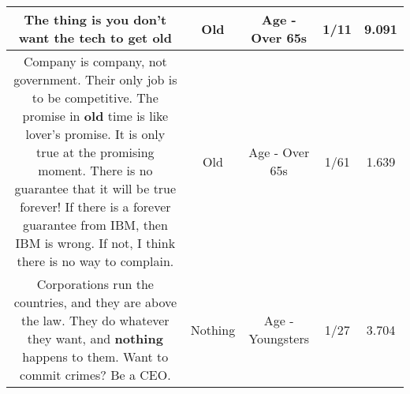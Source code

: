 \documentclass[11pt]{article}
\newlength\mylength
\begin{document}
\begin{center}
\begin{longtable}{|C{.65\mylength}|C{.30\mylength}|C{.12\mylength}|C{.12\mylength}|C{.12\mylength}|}
  \small The thing is you don't want the tech to get old\normalsize   & Old & Age - Over 65s & 1/11 & 9.091 \\  \hline
  \small Company is company, not government. Their only job is to be competitive. The promise in \textbf{old} time is like lover's promise. It is only true at the promising moment. There is no guarantee that it will be true forever! If there is a forever guarantee from IBM, then IBM is wrong. If not, I think there is no way to complain.\normalsize   & Old & Age - Over 65s & 1/61 & 1.639 \\  \hline
  \small Corporations run the countries, and they are above the law. They do whatever they want, and \textbf{nothing} happens to them. Want to commit crimes? Be a CEO.\normalsize   & Nothing & Age - Youngsters & 1/27 & 3.704 \\  \hline

\end{longtable}
\end{center}
\end{document}
